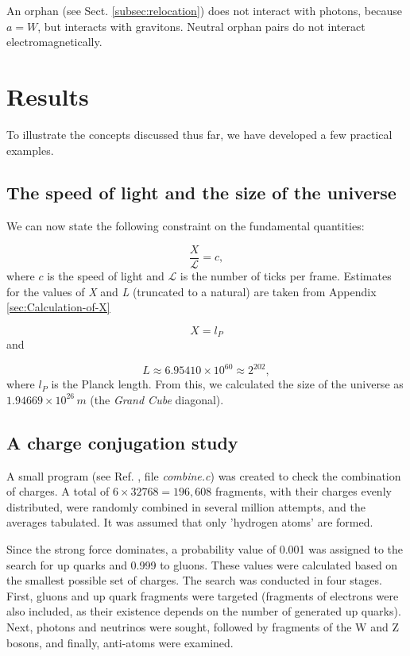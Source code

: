 \documentclass[12pt]{article}
\begin{document}
An orphan (see Sect. \ref{subsec:relocation}) does not interact with photons, because $a=W$, but interacts with gravitons. Neutral orphan pairs do not interact electromagnetically.


\section{Results}\label{sec:Results}

To illustrate the concepts discussed thus far, we have developed a few practical examples.

\subsection{The speed of light and the size of the universe}

We can now state the following constraint on the fundamental quantities:

\[
\frac{X}{\mathcal{L}}=c,
\]
where $c$ is the speed of light and $\mathcal{L}$ is the number of ticks per frame. Estimates for the values of \emph{X} and \emph{L }(truncated to a natural) are taken from Appendix \ref{sec:Calculation-of-X}

\[
X=l_{P}
\]
and

\[
L\approx6.95410\times10^{60}\approx2^{202},
\]
where $l_{P}$ is the Planck length. From this, we calculated the size of the universe as $1.94669\times10^{26}\,m$ (the \emph{Grand Cube} diagonal).

\subsection{A charge conjugation study}

A small program (see Ref. \cite{af_neto}, file \emph{combine.c}) was created to check the combination of charges. A total of $6\times32768=196,608$ fragments, with their charges evenly distributed, were randomly combined in several million attempts, and the averages tabulated. It was assumed that only 'hydrogen atoms' are formed.

Since the strong force dominates, a probability value of 0.001 was assigned to the search for up quarks and 0.999 to gluons. These values were calculated based on the smallest possible set of charges. The search was conducted in four stages. First, gluons and up quark fragments were targeted (fragments of electrons were also included, as their existence depends on the number of generated up quarks). Next, photons and neutrinos were sought, followed by fragments of the W and Z bosons, and finally, anti-atoms were examined.
\end{document}
